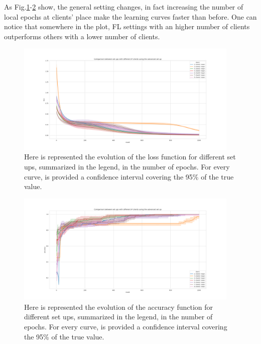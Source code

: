 \documentclass{article} %
\newcounter{other}
\begin{document}
As Fig.\ref{fig6}-\ref{fig7} show, the general setting changes, in fact increasing the number of local epochs 
at clients' place make the learning curves faster than before.
One can notice that somewhere in the plot, FL settings with an higher number of clients 
outperforms others with a lower number of clients.
\begin{figure}[!hb]
    \centering
        \includegraphics[width=0.95\textwidth, keepaspectratio]{images/loss_red_adv.png}
    \caption{Here is represented the evolution of the loss function for different set ups, 
        summarized in the legend, in the number of epochs. For every curve, is provided a confidence 
        interval covering the 95\% of the true value.}
    \label{fig6}
\end{figure}
\begin{figure}[!ht]
    \centering
        \includegraphics[width=0.95\textwidth, keepaspectratio]{images/accuracy_red_adv.png}
    \caption{Here is represented the evolution of the accuracy function for different set ups, 
        summarized in the legend, in the number of epochs. For every curve, is provided a confidence 
        interval covering the 95\% of the true value.}
    \label{fig7}
\end{figure}
\newpage
\end{document}
